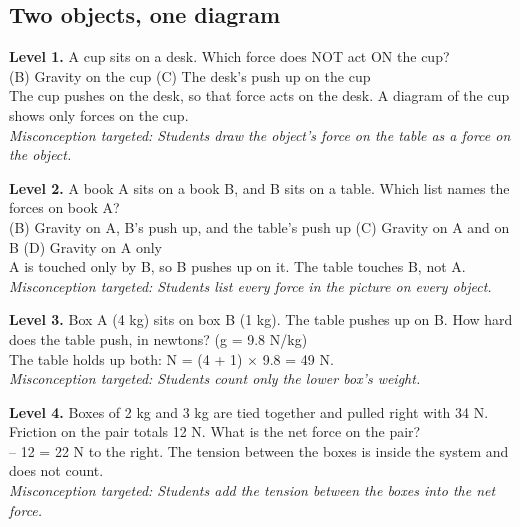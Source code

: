 \documentclass[11pt]{article}
\begin{document}
\subsection*{Two objects, one diagram}
\noindent\textbf{Level 1.} A cup sits on a desk. Which force does NOT act ON the cup?\\  \quad (B) Gravity on the cup \quad (C) The desk's push up on the cup\\  \quad The cup pushes on the desk, so that force acts on the desk. A diagram of the cup shows only forces on the cup.\\ \textit{Misconception targeted: Students draw the object's force on the table as a force on the object.}\par\medskip
\noindent\textbf{Level 2.} A book A sits on a book B, and B sits on a table. Which list names the forces on book A?\\  \quad (B) Gravity on A, B's push up, and the table's push up \quad (C) Gravity on A and on B \quad (D) Gravity on A only\\  \quad A is touched only by B, so B pushes up on it. The table touches B, not A.\\ \textit{Misconception targeted: Students list every force in the picture on every object.}\par\medskip
\noindent\textbf{Level 3.} Box A (4 kg) sits on box B (1 kg). The table pushes up on B. How hard does the table push, in newtons? (g = 9.8 N/kg)\\  \quad The table holds up both: N = (4 + 1) $\times$ 9.8 = 49 N.\\ \textit{Misconception targeted: Students count only the lower box's weight.}\par\medskip
\noindent\textbf{Level 4.} Boxes of 2 kg and 3 kg are tied together and pulled right with 34 N. Friction on the pair totals 12 N. What is the net force on the pair?\\   -- 12 = 22 N to the right. The tension between the boxes is inside the system and does not count.\\ \textit{Misconception targeted: Students add the tension between the boxes into the net force.}\par\medskip
\end{document}
